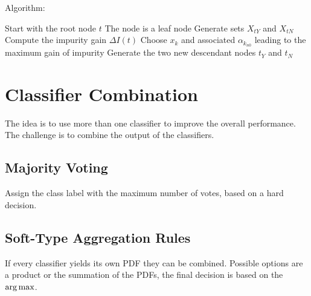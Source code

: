Algorithm:
\begin{algorithmic}
    \State Start with the root node $t$
            \State The node is a leaf node
        \Else
                    \State Generate sets $X_{tY}$ and $X_{tN}$
                    \State Compute the impurity gain $\Delta I(t)$
                \EndFor 
            \EndFor
            \State Choose $x_k$ and associated $\alpha_{k_{n0}}$ leading to the maximum gain of impurity
            \State Generate the two new descendant nodes $t_Y$ and $t_N$
        \EndIf
    \EndFor
\end{algorithmic}

\section{Classifier Combination}
The idea is to use more than one classifier to improve the overall performance.
The challenge is to combine the output of the classifiers.

\subsection{Majority Voting}
Assign the class label with the maximum number of votes, based on a hard decision.

\subsection{Soft-Type Aggregation Rules}
If every classifier yields its own PDF they can be combined. Possible options are a product or the summation of the PDFs, the final decision is based on the $\operatorname*{arg\,max}$.
